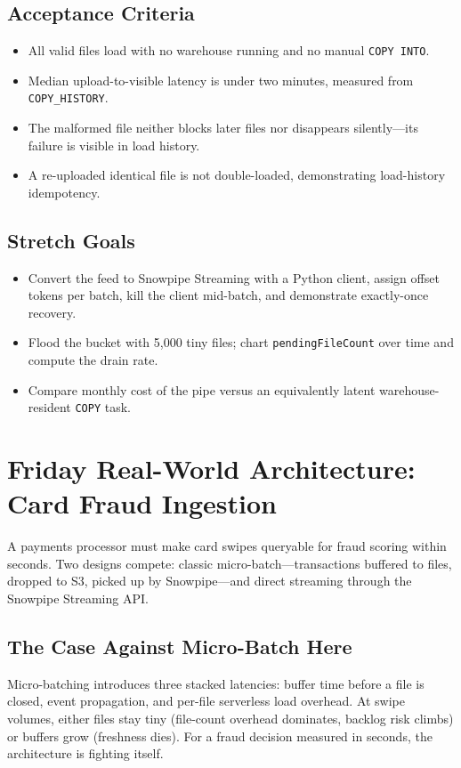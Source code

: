 \subsection*{Acceptance Criteria}
\begin{itemize}
    \item All valid files load with no warehouse running and no manual \texttt{COPY INTO}.
    \item Median upload-to-visible latency is under two minutes, measured from \texttt{COPY\_HISTORY}.
    \item The malformed file neither blocks later files nor disappears silently---its failure is visible in load history.
    \item A re-uploaded identical file is not double-loaded, demonstrating load-history idempotency.
\end{itemize}

\subsection*{Stretch Goals}
\begin{itemize}
    \item Convert the feed to Snowpipe Streaming with a Python client, assign offset tokens per batch, kill the client mid-batch, and demonstrate exactly-once recovery.
    \item Flood the bucket with 5,000 tiny files; chart \texttt{pendingFileCount} over time and compute the drain rate.
    \item Compare monthly cost of the pipe versus an equivalently latent warehouse-resident \texttt{COPY} task.
\end{itemize}

\section{Friday Real-World Architecture: Card Fraud Ingestion}
A payments processor must make card swipes queryable for fraud scoring within seconds. Two designs compete: classic micro-batch---transactions buffered to files, dropped to S3, picked up by Snowpipe---and direct streaming through the Snowpipe Streaming API.

\subsection{The Case Against Micro-Batch Here}
Micro-batching introduces three stacked latencies: buffer time before a file is closed, event propagation, and per-file serverless load overhead. At swipe volumes, either files stay tiny (file-count overhead dominates, backlog risk climbs) or buffers grow (freshness dies). For a fraud decision measured in seconds, the architecture is fighting itself.

